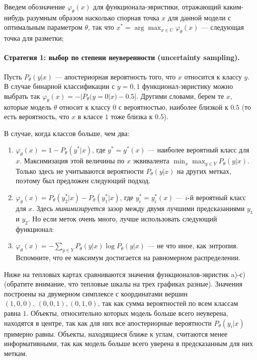 \documentclass[specialist, 12pt, href]{article}
\begin{document}
Введем обозначение \(\varphi_{\theta}(x)\) для функционала-эвристики, отражающий каким-нибудь разумным образом насколько спорная точка $x$ для данной модели с оптимальным параметром $\theta$, так что
\(x^* = \arg\max_{x \in U} \varphi_{\theta}(x)\) --- следующая точка для
разметки;

\paragraph{Стратегия 1: выбор по степени неуверенности (uncertainty
sampling).}

Пусть \(P_{\theta}(y|x)\) --- апостериорная вероятность того, что \(x\)
относится к классу \(y\). В случае бинарной классификации с \(y = 0, 1\)
функционал-эвристику можно выбрать так
\(\varphi_{\theta}(x) = -|P_{\theta}(y = 0|x) - 0.5|\). Другими словами,
берем те \(x\), которые модель \(\theta\) относит к классу \(0\) с
вероятностью, наиболее близкой к \(0.5\) (то есть вероятность, что \(x\)
в классе \(1\) тоже близка к \(0.5\)).

В случае, когда классов больше, чем два:

\begin{enumerate}
\def\labelenumi{\alph{enumi})}
\item
  \(\varphi_{\theta}(x) = 1 - P_{\theta}(y^*|x)\), где \(y^* = y^*(x)\)
  --- наиболее вероятный класс для \(x\). Максимизация этой величины по
  \(x\) эквивалента \(\min_x\max_{y\in Y} P_{\theta}(y|x)\). Только
  здесь не учитываются вероятности \(P_{\theta}(y|x)\) на других метках,
  поэтому был предложен следующий подход.
\item
  \(\varphi_{\theta}(x) = P_{\theta}(y^*_2|x) - P_{\theta}(y^*_1|x)\),
  где \(y^*_i = y^*_i(x)\) --- \(i\)-й вероятный класс для \(x\). Здесь
  \emph{минимизируется} зазор между двумя лучшими предсказаниями \(y_1\)
  и \(y_2\). Но если меток очень много, лучше использовать следующий
  функционал:
\item
  \(\varphi_{\theta}(x) = - \sum_{y \in Y} P_{\theta}(y|x) \log P_{\theta}(y|x)\)
  --- не что иное, как энтропия. Вспомните, что ее максимум достигается
  на равномерном распределении.
\end{enumerate}

Ниже на тепловых картах сравниваются значения функционалов-эвристик
a)-с) (обратите внимание, что тепловые шкалы на трех графиках разные). Значения построены на двумерном симплексе с координатами вершин \((1, 0, 0),\, (0, 0, 1), (0, 1, 0)\), так как сумма вероятностей по всем классам равна \(1\).
Объекты, относительно которых модель больше всего неуверена, находятся в
центре, так как для них все апостериорные вероятности
\(P_{\theta}(y_i|x)\) примерно равны. Объекты, находящиеся ближе к
углам, считаются менее информативными, так как модель больше всего
уверена в предсказанным для них меткам.
\end{document}

